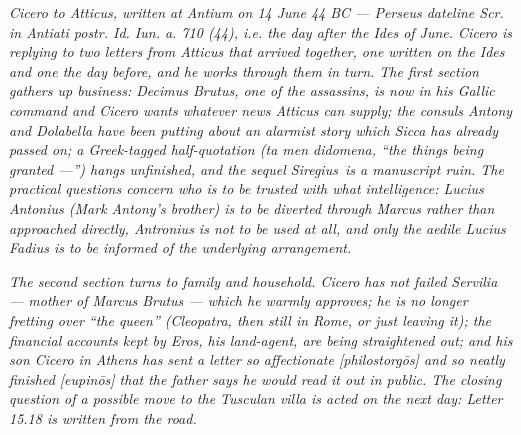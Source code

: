 
\textit{Cicero to Atticus, written at Antium on 14 June 44 BC ---
Perseus dateline \textit{Scr. in Antiati postr. Id. Iun. a. 710
(44)}, i.e. the day after the Ides of June. Cicero is replying
to two letters from Atticus that arrived together, one written
on the Ides and one the day before, and he works through them
in turn. The first section gathers up business: Decimus Brutus,
one of the assassins, is now in his Gallic command and Cicero
wants whatever news Atticus can supply; the consuls Antony and
Dolabella have been putting about an alarmist story which Sicca
has already passed on; a Greek-tagged half-quotation
(\textit{ta men didomena}, ``the things being granted ---'')
hangs unfinished, and the sequel \dag Siregius\dag\ is a
manuscript ruin. The practical questions concern who is to be
trusted with what intelligence: Lucius Antonius (Mark Antony's
brother) is to be diverted through Marcus rather than approached
directly, Antronius is not to be used at all, and only the
aedile Lucius Fadius is to be informed of the underlying
arrangement.}

\textit{The second section turns to family and household. Cicero
has not failed Servilia --- mother of Marcus Brutus --- which
he warmly approves; he is no longer fretting over ``the queen''
(Cleopatra, then still in Rome, or just leaving it); the
financial accounts kept by Eros, his land-agent, are being
straightened out; and his son Cicero in Athens has sent a
letter so affectionate \textit{[philostorg\=os]} and so neatly
finished \textit{[eupin\=os]} that the father says he would
read it out in public. The closing question of a possible move
to the Tusculan villa is acted on the next day: Letter 15.18 is
written from the road.}
